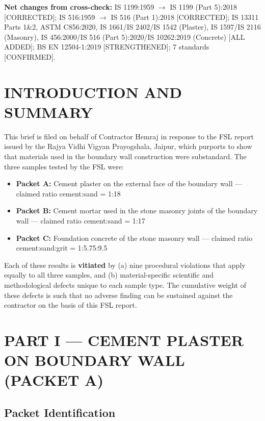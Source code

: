 \documentclass[12pt, a4paper]{article}
\begin{document}
\textbf{Net changes from cross-check:} IS 1199:1959 $\rightarrow$ IS 1199 (Part 5):2018 [CORRECTED]; IS 516:1959 $\rightarrow$ IS 516 (Part 1):2018 [CORRECTED]; IS 13311 Parts 1\&2, ASTM C856:2020, IS 1661/IS 2402/IS 1542 (Plaster), IS 1597/IS 2116 (Masonry), IS 456:2000/IS 516 (Part 5):2020/IS 10262:2019 (Concrete) [ALL ADDED]; BS EN 12504-1:2019 [STRENGTHENED]; 7 standards [CONFIRMED].

\section{INTRODUCTION AND SUMMARY}

This brief is filed on behalf of Contractor Hemraj in response to the FSL report issued by the Rajya Vidhi Vigyan Prayogshala, Jaipur, which purports to show that materials used in the boundary wall construction were substandard. The three samples tested by the FSL were:

\begin{itemize}
  \item \textbf{Packet A:} Cement plaster on the external face of the boundary wall --- claimed ratio cement:sand = 1:18
  \item \textbf{Packet B:} Cement mortar used in the stone masonry joints of the boundary wall --- claimed ratio cement:sand = 1:17
  \item \textbf{Packet C:} Foundation concrete of the stone masonry wall --- claimed ratio cement:sand:grit = 1:5.75:9.5
\end{itemize}

Each of these results is \textbf{vitiated} by (a) nine procedural violations that apply equally to all three samples, and (b) material-specific scientific and methodological defects unique to each sample type. The cumulative weight of these defects is such that no adverse finding can be sustained against the contractor on the basis of this FSL report.

\section{PART I --- CEMENT PLASTER ON BOUNDARY WALL (PACKET A)}

\subsection{Packet Identification}
\end{document}
